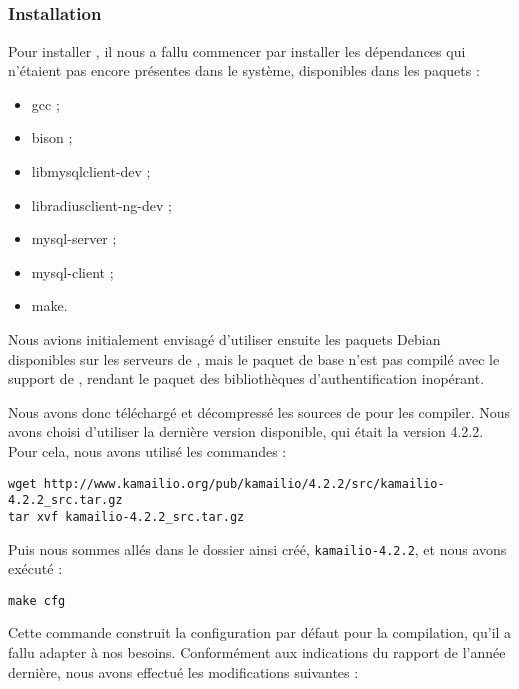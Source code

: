 \subsection{\kam}

\subsubsection{Installation}

Pour installer {\kam}, il nous a fallu commencer par installer les dépendances qui n’étaient pas encore présentes dans le système, disponibles dans les paquets :

\begin{itemize}
	\item{gcc} ;
	\item{bison} ;
	\item{libmysqlclient-dev} ;
	\item{libradiusclient-ng-dev} ;
	\item{mysql-server} ;
	\item{mysql-client} ;
	\item{make}.
\end{itemize}

Nous avions initialement envisagé d’utiliser ensuite les paquets Debian disponibles sur les serveurs de {\kam}, mais le paquet de base n’est pas compilé avec le support de {\rad}, rendant le paquet des bibliothèques d’authentification {\rad} inopérant.

Nous avons donc téléchargé et décompressé les sources de {\kam} pour les compiler. Nous avons choisi d’utiliser la dernière version disponible, qui était la version 4.2.2. Pour cela, nous avons utilisé les commandes :

\begin{small}
\begin{verbatim}
wget http://www.kamailio.org/pub/kamailio/4.2.2/src/kamailio-4.2.2_src.tar.gz
tar xvf kamailio-4.2.2_src.tar.gz
\end{verbatim}
\end{small}

Puis nous sommes allés dans le dossier ainsi créé, \texttt{kamailio-4.2.2}, et nous avons exécuté :

\begin{verbatim}
make cfg
\end{verbatim}

Cette commande construit la configuration par défaut pour la compilation, qu’il a fallu adapter à nos besoins. Conformément aux indications du rapport de l’année dernière, nous avons effectué les modifications suivantes :

